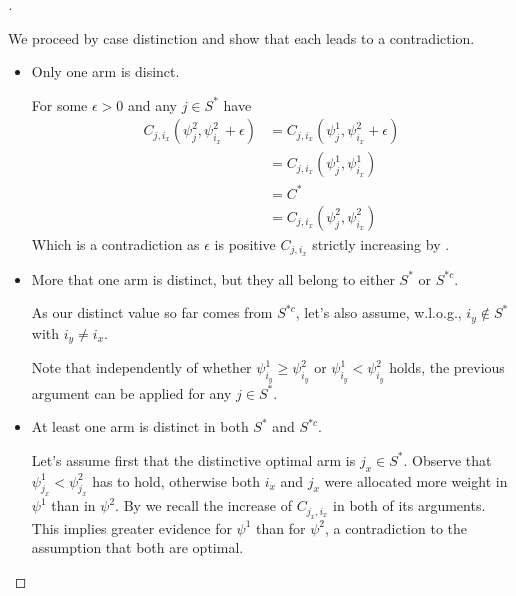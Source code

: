 \begin{proof}[]
\begin{enumerate}[(i)]
    We proceed by case distinction and show that each leads to a contradiction.
    \begin{itemize}
      \item Only one arm is disinct.

      For some $\epsilon > 0$ and any $j \in S^*$ have
      \begin{align}
        C_{j, i_x}(\psi^2_j, \psi^2_{i_x} + \epsilon) &= C_{j, i_x}(\psi^1_j, \psi^2_{i_x} + \epsilon) \\
        &= C_{j, i_x}(\psi^1_j, \psi^1_{i_x}) \\
        &= C^* \\
        &= C_{j, i_x}(\psi^2_j, \psi^2_{i_x})
      \end{align}
      Which is a contradiction as $\epsilon$ is positive $C_{j, i_x}$ strictly increasing by .
      \item More that one arm is distinct, but they all belong to either $S^*$ or $S^{*c}$.

      As our distinct value so far comes from $S^{*c}$, let's also assume, w.l.o.g., $i_y \notin S^*$ with $i_y \neq i_x$.

      Note that independently of whether $\psi^1_{i_y} \geq \psi^2_{i_y}$ or $\psi^1_{i_y} < \psi^2_{i_y}$ holds, the previous argument can be applied for any $j \in S^*$.

      \item At least one arm is distinct in both $S^*$ and $S^{*c}$.

      Let's assume first that the distinctive optimal arm is $j_x \in S^*$. Observe that $\psi^1_{j_x} < \psi^2_{j_x}$ has to hold, otherwise both $i_x$ and $j_x$ were allocated more weight in $\psi^1$ than in $\psi^2$. By  we recall the increase of $C_{j_x, i_x}$ in both of its arguments. This implies greater evidence for $\psi^1$ than for $\psi^2$, a contradiction to the assumption that both are optimal.


\end{itemize}
\end{enumerate}
\end{proof}
